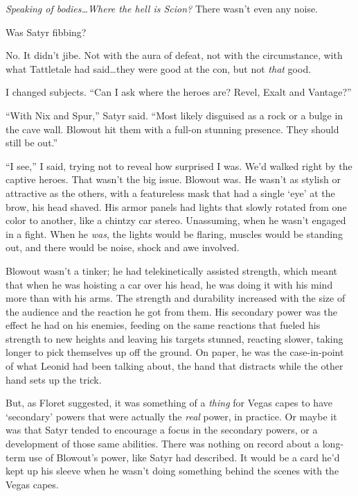 \emph{Speaking of bodies\ldots  Where the hell is Scion?  }There wasn't even any noise.



Was Satyr fibbing?



No.  It didn't jibe.  Not with the aura of defeat, not with the circumstance, with what Tattletale had said\ldots they were good at the con, but not \emph{that} good.



I changed subjects.  ``Can I ask where the heroes are?  Revel, Exalt and Vantage?''



``With Nix and Spur,'' Satyr said.  ``Most likely disguised as a rock or a bulge in the cave wall.  Blowout hit them with a full-on stunning presence.  They should still be out.''



``I see,'' I said, trying not to reveal how surprised I was.  We'd walked right by the captive heroes.  That wasn't the big issue.  Blowout was.  He wasn't as stylish or attractive as the others, with a featureless mask that had a single `eye' at the brow, his head shaved.  His armor panels had lights that slowly rotated from one color to another, like a chintzy car stereo.  Unassuming, when he wasn't engaged in a fight.  When he \emph{was}, the lights would be flaring, muscles would be standing out, and there would be noise, shock and awe involved.



Blowout wasn't a tinker; he had telekinetically assisted strength, which meant that when he was hoisting a car over his head, he was doing it with his mind more than with his arms.  The strength and durability increased with the size of the audience and the reaction he got from them.  His secondary power was the effect he had on his enemies, feeding on the same reactions that fueled his strength to new heights and leaving his targets stunned, reacting slower, taking longer to pick themselves up off the ground.  On paper, he was the case-in-point of what Leonid had been talking about, the hand that distracts while the other hand sets up the trick.



But, as Floret suggested, it was something of a \emph{thing} for Vegas capes to have `secondary' powers that were actually the \emph{real} power, in practice. Or maybe it was that Satyr tended to encourage a focus in the secondary powers, or a development of those same abilities.  There was nothing on record about a long-term use of Blowout's power, like Satyr had described.  It would be a card he'd kept up his sleeve when he wasn't doing something behind the scenes with the Vegas capes.




